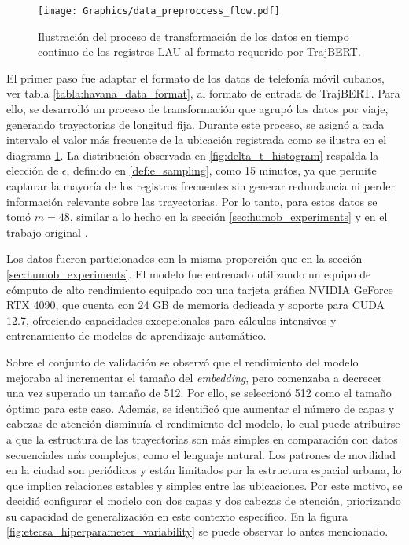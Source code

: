 \begin{figure}[!htb] \centering \texttt{[image: Graphics/data\_preproccess\_flow.pdf]} \caption{Ilustraci\'on del proceso de transformaci\'on de los datos en tiempo continuo de los registros LAU al formato requerido por TrajBERT.} \label{fig:data_preproccess_flow} 
\end{figure}

El primer paso fue adaptar el formato de los datos de telefonía móvil cubanos, ver tabla \ref{tabla:havana_data_format}, al formato de entrada de TrajBERT. Para ello, se desarrolló un proceso de transformación que agrupó los datos por viaje, generando trayectorias de longitud fija. Durante este proceso, se asignó a cada intervalo el valor más frecuente de la ubicación registrada como se ilustra en el diagrama 
\ref{fig:data_preproccess_flow}. La distribución observada en \ref{fig:delta_t_histogram} respalda la elección de $\epsilon$, definido en \ref{def:e_sampling}, como 15 minutos, ya que permite capturar la mayoría de los registros frecuentes sin generar redundancia ni perder información relevante sobre las trayectorias. Por lo tanto, para estos datos se tomó $m = 48$, similar a lo hecho en la sección \ref{sec:humob_experiments} y en el trabajo original \cite{si2023trajbert}. 

Los datos fueron particionados con la misma proporción que en la sección \ref{sec:humob_experiments}. El modelo fue entrenado utilizando un equipo de cómputo de alto rendimiento equipado con una tarjeta gráfica NVIDIA GeForce RTX 4090, que cuenta con 24 GB de memoria dedicada y soporte para CUDA 12.7, ofreciendo capacidades excepcionales para cálculos intensivos y entrenamiento de modelos de aprendizaje automático.  

Sobre el conjunto de validación se observó que el rendimiento del modelo mejoraba al incrementar el tamaño del \textit{embedding}, pero comenzaba a decrecer una vez superado un tamaño de 512. Por ello, se seleccionó 512 como el tamaño óptimo para este caso. Además, se identificó que aumentar el número de capas y cabezas de atención disminuía el rendimiento del modelo, lo cual puede atribuirse a que la estructura de las trayectorias son más simples en comparación con datos secuenciales más complejos, como el lenguaje natural. Los patrones de movilidad en la ciudad son periódicos y están limitados por la estructura espacial urbana, lo que implica relaciones estables y simples entre las ubicaciones. Por este motivo, se decidió configurar el modelo con dos capas y dos cabezas de atención, priorizando su capacidad de generalización en este contexto específico. En la figura \ref{fig:etecsa_hiperparameter_variability} se puede observar lo antes mencionado.

